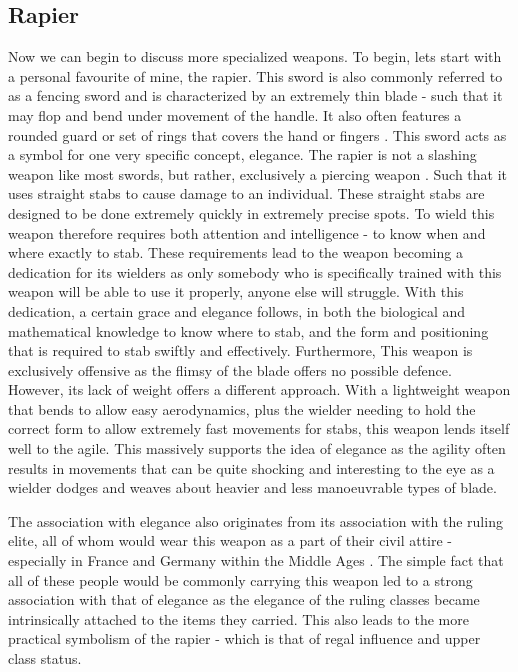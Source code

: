\documentclass{article}
\begin{document}
\subsection{Rapier} \label{rapierSymbol}
Now we can begin to discuss more specialized weapons. To begin, lets start with a personal favourite of mine, the rapier. This sword is also commonly referred to as a fencing sword and is characterized by an extremely thin blade - such that it may flop and bend under movement of the handle. It also often features a rounded guard or set of rings that covers the hand or fingers \parencite{walker2002rapier12}. This sword acts as a symbol for one very specific concept, elegance. The rapier is not a slashing weapon like most swords, but rather, exclusively a piercing weapon \parencite{walker2002rapierNoCut}. Such that it uses straight stabs to cause damage to an individual. These straight stabs are designed to be done extremely quickly in extremely precise spots. To wield this weapon therefore requires both attention and intelligence - to know when and where exactly to stab. These requirements lead to the weapon becoming a dedication for its wielders as only somebody who is specifically trained with this weapon will be able to use it properly, anyone else will struggle. With this dedication, a certain grace and elegance follows, in both the biological and mathematical knowledge \parencite{walker2002rapier25} to know where to stab, and the form and positioning that is required to stab swiftly and effectively. Furthermore, This weapon is exclusively offensive as the flimsy of the blade offers no possible defence. However, its lack of weight offers a different approach. With a lightweight weapon that bends to allow easy aerodynamics, plus the wielder needing to hold the correct form to allow extremely fast movements for stabs, this weapon lends itself well to the agile. This massively supports the idea of elegance as the agility often results in movements that can be quite shocking and interesting to the eye as a wielder dodges and weaves about heavier and less manoeuvrable types of blade.

The association with elegance also originates from its association with the ruling elite, all of whom would wear this weapon as a part of their civil attire - especially in France and Germany within the Middle Ages \parencite{correa2013history}. The simple fact that all of these people would be commonly carrying this weapon led to a strong association with that of elegance as the elegance of the ruling classes became intrinsically attached to the items they carried. This also leads to the more practical symbolism of the rapier - which is that of regal influence and upper class status.
\end{document}
